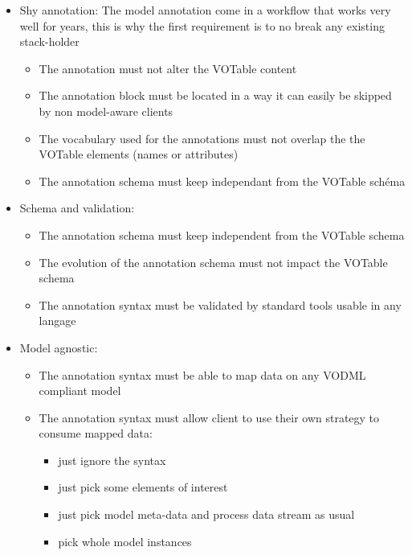 \begin {itemize}
  \item Shy annotation: The model annotation come in a workflow that works very well for years, this is why the first requirement is to no break any existing stack-holder
  \begin {itemize}
    \item The annotation must not alter the VOTable content
    \item The annotation block must be located in a way it can easily be skipped by non model-aware clients
    \item The vocabulary used for the annotations must not overlap the the VOTable elements (names or attributes)    
    \item The annotation schema must keep independant from the VOTable schéma
  \end {itemize}
  
  \item Schema and validation:
  \begin {itemize}
    \item The annotation schema must keep independent from the VOTable schema
    \item The evolution of the annotation schema must not impact the VOTable schema
    \item The annotation syntax must be validated by standard tools usable in any langage
  \end {itemize}
  
  \item Model agnostic:
  \begin {itemize}
    \item The annotation syntax must be able to map data on any VODML compliant model
    \item The annotation syntax must allow client to use their own strategy to consume mapped data:
      \begin {itemize}
        \item just ignore the syntax
        \item just pick some elements of interest 
        \item just pick model meta-data and process data stream as usual
        \item pick whole model instances
      \end {itemize}
  \end {itemize}
  
  
  
  
\end {itemize}